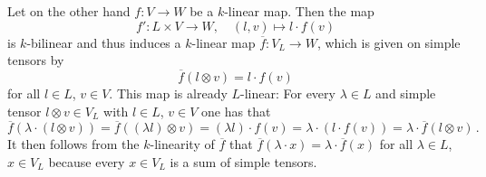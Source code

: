 \begin{fluff}
  Let on the other hand $f \colon V \to W$ be a $k$-linear map.
  Then the map
  \[
            f'
    \colon  L \times V
    \to     W,
    \quad   (l,v)
    \mapsto l \cdot f(v)
  \]
  is $k$-bilinear and thus induces a $k$-linear map $\overline{f} \colon V_L \to W$, which is given on simple tensors by
  \[
      \overline{f}(l \otimes v)
    = l \cdot f(v)
  \]
  for all $l \in L$, $v \in V$.
  This map is already $L$-linear:
  For every $\lambda \in L$ and simple tensor $l \otimes v \in V_L$ with $l \in L$, $v \in V$ one has that
  \[
      \overline{f}(\lambda \cdot (l \otimes v))
    = \overline{f}( (\lambda l) \otimes v )
    = (\lambda l) \cdot f(v)
    = \lambda \cdot (l \cdot f(v))
    = \lambda \cdot \overline{f}(l \otimes v) \,.
  \]
  It then follows from the $k$-linearity of $\overline{f}$ that $\overline{f}(\lambda \cdot x) = \lambda \cdot \overline{f}(x)$ for all $\lambda \in L$, $x \in V_L$ because every $x \in V_L$ is a sum of simple tensors.

\end{fluff}
